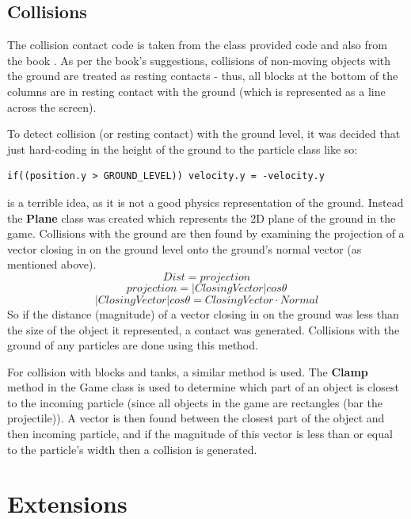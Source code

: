 \documentclass[12pt]{article}
\begin{document}
\subsection{Collisions}
The collision contact code is taken from the class provided code \cite{code} and also from the book \cite{book}. As per the book's suggestions, collisions of non-moving objects with the ground are treated as resting contacts - thus, all blocks at the bottom of the columns are in resting contact with the ground (which is represented as a line across the screen). 
\par 
To detect collision (or resting contact) with the ground level, it was decided that just hard-coding in the height of the ground to the particle class like so:
\begin{lstlisting}
if((position.y > GROUND_LEVEL)) velocity.y = -velocity.y
\end{lstlisting}
is a terrible idea, as it is not a good physics representation of the ground. Instead the \textbf{Plane} class was created which represents the 2D plane of the ground in the game. Collisions with the ground are then found by examining the projection of a vector closing in on the ground level onto the ground's normal vector (as mentioned above). 
$$ Dist = projection $$
$$ projection = |ClosingVector| cos \theta  $$
$$ |ClosingVector| cos \theta = ClosingVector \cdot Normal $$
So if the distance (magnitude) of a vector closing in on the ground was less than the size of the object it represented, a contact was generated. Collisions with the ground of any particles are done using this method.
\par 
For collision with blocks and tanks, a similar method is used. The \textbf{Clamp} method in the Game class is used to determine which part of an object is closest to the incoming particle (since all objects in the game are rectangles (bar the projectile)). A vector is then found between the closest part of the object and then incoming particle, and if the magnitude of this vector is less than or equal to the particle's width then a collision is generated.
\section{Extensions}
\end{document}
